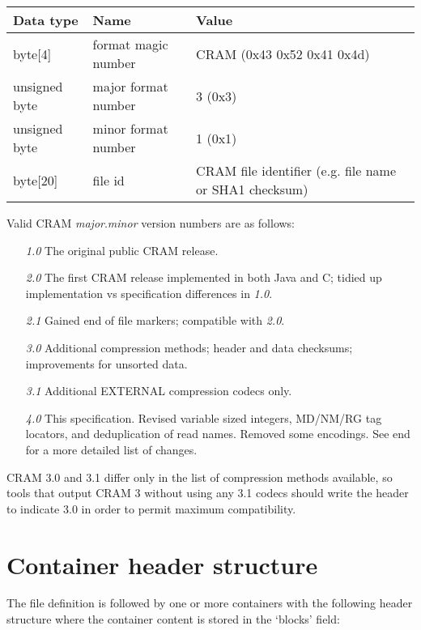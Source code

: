 \documentclass[a4paper]{article}
\begin{document}
\begin{tabular}{|l|l|l|}
\hline
\textbf{Data type} & \textbf{Name} & \textbf{Value}\tabularnewline
\hline
byte[4] & format magic number & CRAM (0x43 0x52 0x41 0x4d)\tabularnewline
\hline
unsigned byte & major format number & 3 (0x3)\tabularnewline
\hline
unsigned byte & minor format number & 1 (0x1)\tabularnewline
\hline
byte[20] & file id & CRAM file identifier (e.g. file name or SHA1 checksum)\tabularnewline
\hline
\end{tabular}

Valid CRAM \textit{major}.\textit{minor} version numbers are as follows:

\begin{itemize}
\item[\textit{1.0}]
The original public CRAM release.

\item[\textit{2.0}]
The first CRAM release implemented in both Java and C; tidied up
implementation vs specification differences in \textit{1.0}.

\item[\textit{2.1}]
Gained end of file markers; compatible with \textit{2.0}.

\item[\textit{3.0}]
Additional compression methods; header and data checksums;
improvements for unsorted data.

\item[\textit{3.1}]
Additional EXTERNAL compression codecs only.

\item[\textit{4.0}]
This specification.  Revised variable sized integers, MD/NM/RG tag
locators, and deduplication of read names.  Removed some encodings.
See end for a more detailed list of changes.
\end {itemize}

CRAM 3.0 and 3.1 differ only in the list of compression
methods available, so tools that output CRAM 3 without using any 3.1
codecs should write the header to indicate 3.0 in order to permit
maximum compatibility.

\section{\textbf{Container header structure}}

The file definition is followed by one or more containers with the following header 
structure where the container content is stored in the `blocks' field:
\end{document}
